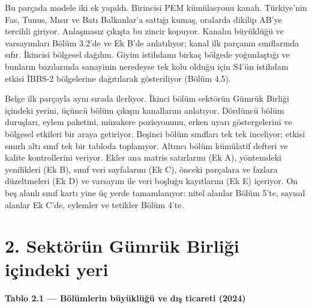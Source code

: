 Bu parçada modele iki ek yapıldı. Birincisi PEM kümülasyonu kanalı. Türkiye'nin Fas, Tunus, Mısır ve Batı Balkanlar'a sattığı kumaş, oralarda dikilip AB'ye tercihli giriyor. Anlaşmasız çıkışta bu zincir kopuyor. Kanalın büyüklüğü ve varsayımları Bölüm 3.2'de ve Ek B'de anlatılıyor; kanal ilk parçanın sınıflarında sıfır. İkincisi bölgesel dağılım. Giyim istihdamı birkaç bölgede yoğunlaştığı ve bunların bazılarında sanayinin neredeyse tek kolu olduğu için S4'ün istihdam etkisi İBBS-2 bölgelerine dağıtılarak gösteriliyor (Bölüm 4.5).

Belge ilk parçayla aynı sırada ilerliyor. İkinci bölüm sektörün Gümrük Birliği içindeki yerini, üçüncü bölüm çıkışın kanallarını anlatıyor. Dördüncü bölüm duruşları, eylem paketini, müzakere pozisyonunu, erken uyarı göstergelerini ve bölgesel etkileri bir araya getiriyor. Beşinci bölüm sınıfları tek tek inceliyor; etkisi sınırlı altı sınıf tek bir tabloda toplanıyor. Altıncı bölüm kümülatif defteri ve kalite kontrollerini veriyor. Ekler ana matris satırlarını (Ek A), yöntemdeki yenilikleri (Ek B), sınıf veri sayfalarını (Ek C), önceki parçalara ve fazlara düzeltmeleri (Ek D) ve varsayım ile veri boşluğu kayıtlarını (Ek E) içeriyor. On beş alanlı sınıf kartı yine üç yerde tamamlanıyor: nitel alanlar Bölüm 5'te, sayısal alanlar Ek C'de, eylemler ve tetikler Bölüm 4'te.

\hypertarget{nace_kartlar_13-15-2-sektuxf6ruxfcn-guxfcmruxfck-birliux11fi-iuxe7indeki-yeri}{%
\section{2. Sektörün Gümrük Birliği içindeki yeri}\label{nace_kartlar_13-15-2-sektuxf6ruxfcn-guxfcmruxfck-birliux11fi-iuxe7indeki-yeri}}


\textbf{Tablo 2.1 --- Bölümlerin büyüklüğü ve dış ticareti (2024)}

\nopagebreak[4]

\begingroup\gbtablo\footnotesize

